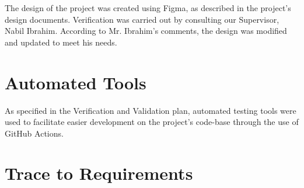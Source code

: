 \documentclass[12pt, titlepage]{article}
\begin{document}
The design of the project was created using Figma, as described in the project's design documents. Verification was carried out by consulting our Supervisor, Nabil Ibrahim. According to Mr. Ibrahim's comments, the design was modified and updated to meet his needs.

\section{Automated Tools}

As specified in the Verification and Validation plan, automated testing tools were used to facilitate easier development on the project's code-base through the use of GitHub Actions.

\section{Trace to Requirements}
\end{document}
